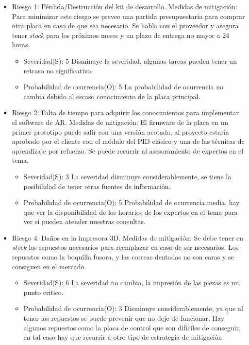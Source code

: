 \documentclass[
11pt, %
codirector, %
]{charter}
\begin{document}
\begin{itemize}
\item Riesgo 1: Pérdida/Destrucción	del kit de desarrollo.
	Medidas de mitigación: Para minimizar este riesgo se prevee una partida presupuestaria para comprar otra placa en caso de que sea necesario. Se habla con el proveedor y asegura tener \textit{stock} para los próximos meses y un plazo de entrega no mayor a 24 horas.
	\begin{itemize}
	\item Severidad(S): 5 Disminuye la severidad, algunas tareas pueden tener un retraso no significativo. 
	\item  Probabilidad de ocurrencia(O): 5 La probabilidad de ocurrencia no cambia debido al escaso conocimiento de la placa principal. 
	\end{itemize}
\item Riesgo 2:  Falta de tiempo para adquirir los conocimientos
para implementar el software de AR.
	Medidas de mitigación: El firmware de la placa en un primer prototipo puede salir con una versión acotada, al proyecto estaría aprobado por el cliente con el módulo del PID clásico y una de las técnicas de aprendizaje por refuerzo. Se puede recurrir al asesoramiento de expertos en el tema.
	\begin{itemize}
	\item Severidad(S): 3 La severidad disminuye considerablemente, se tiene la posibilidad de tener otras fuentes de información.
	\item  Probabilidad de ocurrencia(O): 5 Probabilidad de ocurrencia media, hay que ver la disponibilidad de los horarios de los expertos en el tema para ver si pueden atender nuestras consultas.  
	\end{itemize} 
\item Riesgo 4: Daños en la	impresora 3D.
	Medidas de mitigación: Se debe tener en \textit{stock} los repuestos necesarios para reemplazar en caso de ser necesarios. Los repuestos como la boquilla fusora, y las correas dentadas no son caras y se consiguen en el mercado.
	\begin{itemize}
	\item Severidad(S): 6 La severidad no cambia, la impresión de las piezas es un punto critico.
	\item  Probabilidad de ocurrencia(O): 3 Disminuye considerablemente, ya que al tener los repuestos se puede prevenir que no deje de funcionar. Hay algunos repuestos como la placa de control que son difíciles de conseguir, en tal caso hay que recurrir a otro tipo de estrategia de mitigación

\end{itemize}
\end{itemize}
\end{document}
